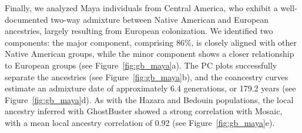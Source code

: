 Finally, we analyzed Maya individuals from Central America, who exhibit a well-documented two-way admixture between Native American and European ancestries, largely resulting from European colonization. We identified two components: the major component, comprising 86\%, is closely aligned with other Native American groups, while the minor component shows a closer relationship to European groups (see Figure~\ref{fig:gb_maya}a). The PC plots successfully separate the ancestries (see Figure~\ref{fig:gb_maya}b), and the coancestry curves estimate an admixture date of approximately 6.4 generations, or 179.2 years (see Figure~\ref{fig:gb_maya}d). As with the Hazara and Bedouin populations, the local ancestry inferred with GhostBuster showed a strong correlation with Mosaic, with a mean local ancestry correlation of 0.92 (see Figure~\ref{fig:gb_maya}e).

